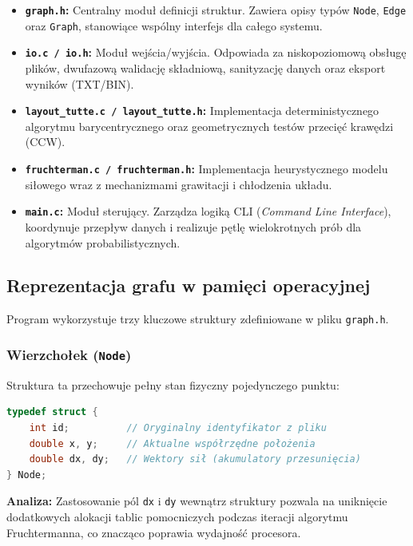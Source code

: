 \documentclass[12pt,a4paper]{article}
\begin{document}
\begin{itemize}[label=\textbullet]
    \item \textbf{\texttt{graph.h}:} Centralny moduł definicji struktur. Zawiera opisy typów \texttt{Node}, \texttt{Edge} oraz \texttt{Graph}, stanowiące wspólny interfejs dla całego systemu.
    \item \textbf{\texttt{io.c / io.h}:} Moduł wejścia/wyjścia. Odpowiada za niskopoziomową obsługę plików, dwufazową walidację składniową, sanityzację danych oraz eksport wyników (TXT/BIN).
    \item \textbf{\texttt{layout\_tutte.c / layout\_tutte.h}:} Implementacja deterministycznego algorytmu barycentrycznego oraz geometrycznych testów przecięć krawędzi (CCW).
    \item \textbf{\texttt{fruchterman.c / fruchterman.h}:} Implementacja heurystycznego modelu siłowego wraz z mechanizmami grawitacji i chłodzenia układu.
    \item \textbf{\texttt{main.c}:} Moduł sterujący. Zarządza logiką CLI (\textit{Command Line Interface}), koordynuje przepływ danych i realizuje pętlę wielokrotnych prób dla algorytmów probabilistycznych.
\end{itemize}

\subsection{Reprezentacja grafu w pamięci operacyjnej}
Program wykorzystuje trzy kluczowe struktury zdefiniowane w pliku \texttt{graph.h}.

\subsubsection{Wierzchołek (\texttt{Node})}
Struktura ta przechowuje pełny stan fizyczny pojedynczego punktu:
\begin{lstlisting}[language=C, caption={Struktura wierzchołka w graph.h}]
typedef struct {
    int id;          // Oryginalny identyfikator z pliku
    double x, y;     // Aktualne współrzędne położenia
    double dx, dy;   // Wektory sił (akumulatory przesunięcia)
} Node;
\end{lstlisting}
\textbf{Analiza:} Zastosowanie pól \texttt{dx} i \texttt{dy} wewnątrz struktury pozwala na uniknięcie dodatkowych alokacji tablic pomocniczych podczas iteracji algorytmu Fruchtermanna, co znacząco poprawia wydajność procesora.
\end{document}
